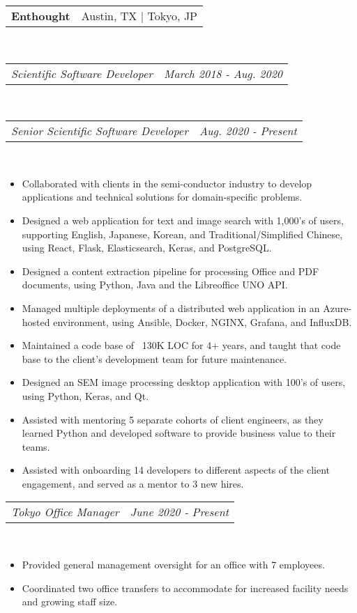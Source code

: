 \documentclass{article}
\makeatletter
\newcommand{\subheading}[2]{
	\begin{tabular*}{\textwidth}{l@{\extracolsep{\fill}}r}
		\textbf{#1} & #2 \\
	\end{tabular*} \\
}
\newcommand{\itemheading}[2]{
	\vspace{0.2em}
	\begin{tabular*}{\textwidth}{l@{\extracolsep{\fill}}r}
		\textit{#1} & \textit{#2} \\
	\end{tabular*} \\
	\vspace{-0.5em}
}
\makeatother
\begin{document}
\subheading{Enthought}{Austin, TX | Tokyo, JP}
\itemheading{Scientific Software Developer}{March 2018 - Aug. 2020}
\vspace{0.5em}
\itemheading{Senior Scientific Software Developer}{Aug. 2020 - Present}
\begin{itemize}
	\item Collaborated with clients in the semi-conductor industry to develop
	      applications and technical solutions for domain-specific problems.
	\item Designed a web application for text and image search with 1,000's of
	      users, supporting English, Japanese, Korean, and
		  Traditional/Simplified Chinese, using React, Flask, Elasticsearch,
		  Keras, and PostgreSQL.
	\item Designed a content extraction pipeline for processing Office and PDF
	      documents, using Python, Java and the Libreoffice UNO API.
	\item Managed multiple deployments of a distributed web application in an
	      Azure-hosted environment, using Ansible, Docker, NGINX, Grafana, and
		  InfluxDB.
	\item Maintained a code base of ~130K LOC for 4+ years, and taught that
	      code base to the client's development team for future maintenance.
	\item Designed an SEM image processing desktop application with 100's of
	      users, using Python, Keras, and Qt.
	\item Assisted with mentoring 5 separate cohorts of client engineers, as
		  they learned Python and developed software to provide business value
		  to their teams.
	\item Assisted with onboarding 14 developers to different aspects of the
	      client engagement, and served as a mentor to 3 new hires.
\end{itemize}
\itemheading{Tokyo Office Manager}{June 2020 - Present}
\begin{itemize}
	\item Provided general management oversight for an office with 7
		  employees.
	\item Coordinated two office transfers to accommodate for increased
		  facility needs and growing staff size.
\end{itemize}
\end{document}
